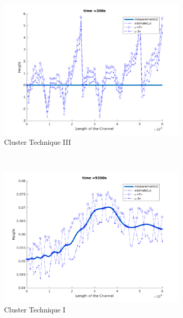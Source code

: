 \begin{figure}[H]
\begin{subfigure}[b]{0.3\textwidth}
\includegraphics[width=\textwidth]{figures_2/fig31}
\caption{Cluster Technique III}
\end{subfigure}   \\
\begin{subfigure}[b]{0.3\textwidth}
\centering
\includegraphics[width=\textwidth]{figures_2/fig131}
\caption{Cluster Technique I}
\end{subfigure}   
\begin{subfigure}[b]{0.3\textwidth}
\centering

\end{subfigure}
\end{figure}
